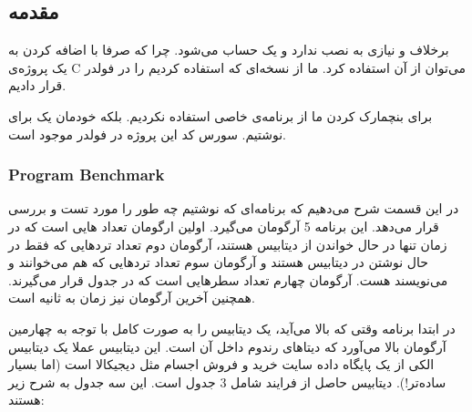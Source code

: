 \subsection{مقدمه}
برخلاف
 و 
نیازی به نصب ندارد و یک
حساب می‌شود. چرا که صرفا با اضافه کردن
به یک پروژه‌ی C می‌توان از آن استفاده کرد.
ما از نسخه‌ای که استفاده کردیم را در فولدر
قرار دادیم.

برای بنچمارک کردن
ما از برنامه‌ی خاصی استفاده نکردیم. بلکه خودمان یک
برای
نوشتیم. سورس کد این پروژه در فولدر
موجود است.

\subsubsection{Program Benchmark}
در این قسمت شرح می‌دهیم که برنامه‌ای که نوشتیم چه طور
را مورد تست و بررسی قرار می‌دهد. این برنامه 5 آرگومان می‌گیرد. اولین ارگومان تعداد
هایی
است که در زمان
تنها در حال خواندن از دیتابیس هستند، آرگومان دوم تعداد ترد‌هایی که فقط در حال
نوشتن در دیتابیس هستند و آرگومان سوم تعداد ترد‌هایی که هم می‌‌خوانند و می‌نویسند هست.
آرگومان چهارم تعداد سطر‌هایی است که در جدول
قرار می‌گیرند. همچنین آخرین آرگومان نیز زمان به ثانیه است.

در ابتدا برنامه وقتی که بالا می‌آید، یک دیتابیس را به صورت کامل با توجه به چهارمین آرگومان بالا می‌آورد که
دیتا‌های رندوم داخل آن است. این دیتابیس عملا یک دیتابیس الکی از یک پایگاه داده سایت
خرید و فروش اجسام مثل دیجیکالا است (اما بسیار ساده‌تر!). دیتابیس حاصل از فرایند
شامل 3 جدول است. این سه جدول به شرح زیر هستند:

